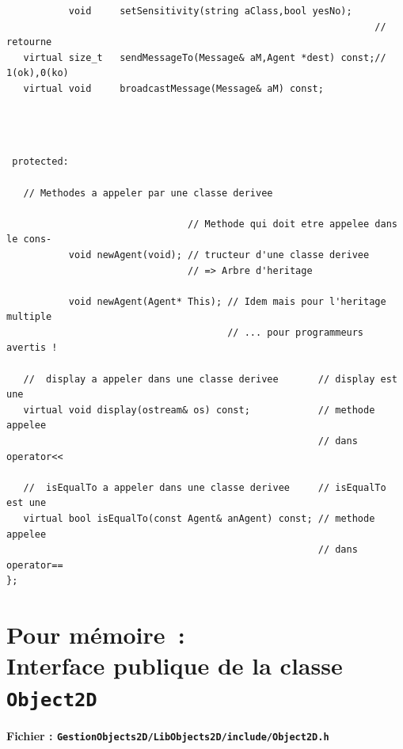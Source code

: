 \documentclass[12pt]{article}
\begin{document}
\begin{small}
\begin{verbatim}
           void     setSensitivity(string aClass,bool yesNo);
                                                                 // retourne
   virtual size_t   sendMessageTo(Message& aM,Agent *dest) const;// 1(ok),0(ko)
   virtual void     broadcastMessage(Message& aM) const;
\end{verbatim}
\newpage
\begin{verbatim}



 protected:

   // Methodes a appeler par une classe derivee

                                // Methode qui doit etre appelee dans le cons-
           void newAgent(void); // tructeur d'une classe derivee
                                // => Arbre d'heritage

           void newAgent(Agent* This); // Idem mais pour l'heritage multiple
                                       // ... pour programmeurs avertis !

   //  display a appeler dans une classe derivee       // display est une
   virtual void display(ostream& os) const;            // methode appelee
                                                       // dans operator<<

   //  isEqualTo a appeler dans une classe derivee     // isEqualTo est une
   virtual bool isEqualTo(const Agent& anAgent) const; // methode appelee
                                                       // dans operator==
};
\end{verbatim}
\end{small}

\section{Pour m\'emoire~:\\
Interface publique de la classe {\tt Object2D}}

\begin{center}
{\bf Fichier : {\tt GestionObjects2D/LibObjects2D/include/Object2D.h}}
\end{center}
\end{document}

